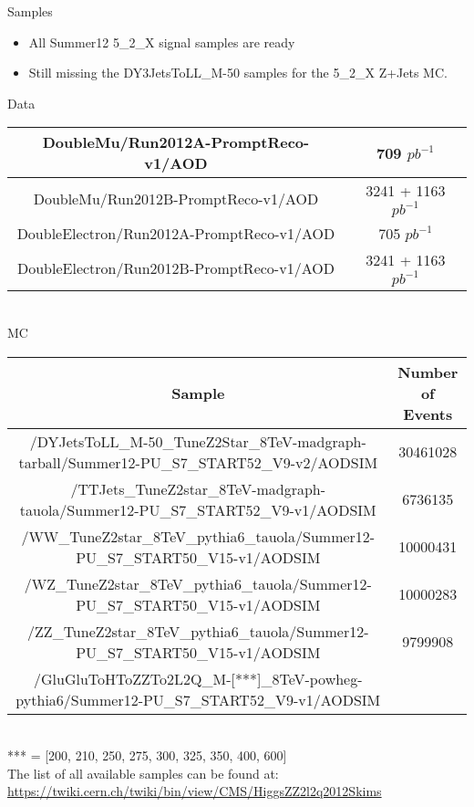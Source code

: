 \documentclass{beamer}
\begin{document}
\begin{frame}{Samples}
  
  \begin{itemize}
    \item
      All Summer12 5\_2\_X signal samples are ready
    \item
      Still missing the DY3JetsToLL\_M-50 samples for the 5\_2\_X Z+Jets MC.
  \end{itemize}
  \begin{center}
    Data
    \\
    { \tiny
      \begin{tabular}{ | c | c |}
        \hline
        DoubleMu/Run2012A-PromptReco-v1/AOD & 709 $pb^{-1}$ \\ \hline
        DoubleMu/Run2012B-PromptReco-v1/AOD & 3241 + 1163 $pb^{-1}$ \\ \hline
        DoubleElectron/Run2012A-PromptReco-v1/AOD & 705 $pb^{-1}$ \\ \hline
        DoubleElectron/Run2012B-PromptReco-v1/AOD & 3241 + 1163 $pb^{-1}$ \\ \hline
      \end{tabular}
    }
\\
    MC
    { \tiny
      \begin{tabular}{ | c | c |}
          \hline
          Sample & Number of Events \\ \hline \hline
          /DYJetsToLL\_M-50\_TuneZ2Star\_8TeV-madgraph-tarball/Summer12-PU\_S7\_START52\_V9-v2/AODSIM & 30461028 \\ \hline
          /TTJets\_TuneZ2star\_8TeV-madgraph-tauola/Summer12-PU\_S7\_START52\_V9-v1/AODSIM&	 6736135\\ \hline
          /WW\_TuneZ2star\_8TeV\_pythia6\_tauola/Summer12-PU\_S7\_START50\_V15-v1/AODSIM	&	 10000431\\ \hline
          /WZ\_TuneZ2star\_8TeV\_pythia6\_tauola/Summer12-PU\_S7\_START50\_V15-v1/AODSIM	&	 10000283\\ \hline
          /ZZ\_TuneZ2star\_8TeV\_pythia6\_tauola/Summer12-PU\_S7\_START50\_V15-v1/AODSIM	&	 9799908\\ \hline
          /GluGluToHToZZTo2L2Q\_M-[***]\_8TeV-powheg-pythia6/Summer12-PU\_S7\_START52\_V9-v1/AODSIM & \\ \hline

        \end{tabular}
       }
\\
{\tiny
*** = [200, 210, 250, 275, 300, 325, 350, 400, 600]
 }
\\
\vspace{1.5em}
      \footnotesize
      The list of all available samples can be found at: \footnotesize { \color{blue} \url{https://twiki.cern.ch/twiki/bin/view/CMS/HiggsZZ2l2q2012Skims}}
  \end{center}
\end{frame}
\end{document}
